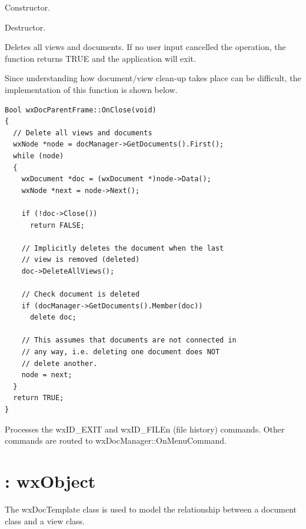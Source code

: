 Constructor.



Destructor.



Deletes all views and documents. If no user input cancelled the
operation, the function returns TRUE and the application will exit.

Since understanding how document/view clean-up takes place can be difficult,
the implementation of this function is shown below.

\begin{verbatim}
Bool wxDocParentFrame::OnClose(void)
{
  // Delete all views and documents
  wxNode *node = docManager->GetDocuments().First();
  while (node)
  {
    wxDocument *doc = (wxDocument *)node->Data();
    wxNode *next = node->Next();

    if (!doc->Close())
      return FALSE;

    // Implicitly deletes the document when the last
    // view is removed (deleted)
    doc->DeleteAllViews();

    // Check document is deleted
    if (docManager->GetDocuments().Member(doc))
      delete doc;

    // This assumes that documents are not connected in
    // any way, i.e. deleting one document does NOT
    // delete another.
    node = next;
  }
  return TRUE;
}
\end{verbatim}



Processes the wxID\_EXIT and wxID\_FILEn (file history) commands.
Other commands are routed to wxDocManager::OnMenuCommand.


\section{: wxObject}\label{wxdoctemplate}


The wxDocTemplate class is used to model the relationship between a
document class and a view class.


